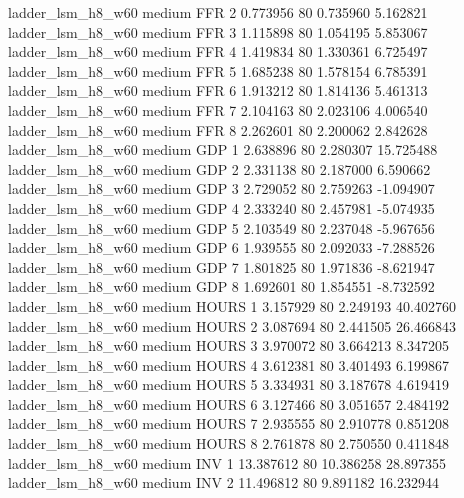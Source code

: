   ladder_lsm_h8_w60     medium      FFR                 2  0.773956 80       0.735960           5.162821
  ladder_lsm_h8_w60     medium      FFR                 3  1.115898 80       1.054195           5.853067
  ladder_lsm_h8_w60     medium      FFR                 4  1.419834 80       1.330361           6.725497
  ladder_lsm_h8_w60     medium      FFR                 5  1.685238 80       1.578154           6.785391
  ladder_lsm_h8_w60     medium      FFR                 6  1.913212 80       1.814136           5.461313
  ladder_lsm_h8_w60     medium      FFR                 7  2.104163 80       2.023106           4.006540
  ladder_lsm_h8_w60     medium      FFR                 8  2.262601 80       2.200062           2.842628
  ladder_lsm_h8_w60     medium      GDP                 1  2.638896 80       2.280307          15.725488
  ladder_lsm_h8_w60     medium      GDP                 2  2.331138 80       2.187000           6.590662
  ladder_lsm_h8_w60     medium      GDP                 3  2.729052 80       2.759263          -1.094907
  ladder_lsm_h8_w60     medium      GDP                 4  2.333240 80       2.457981          -5.074935
  ladder_lsm_h8_w60     medium      GDP                 5  2.103549 80       2.237048          -5.967656
  ladder_lsm_h8_w60     medium      GDP                 6  1.939555 80       2.092033          -7.288526
  ladder_lsm_h8_w60     medium      GDP                 7  1.801825 80       1.971836          -8.621947
  ladder_lsm_h8_w60     medium      GDP                 8  1.692601 80       1.854551          -8.732592
  ladder_lsm_h8_w60     medium    HOURS                 1  3.157929 80       2.249193          40.402760
  ladder_lsm_h8_w60     medium    HOURS                 2  3.087694 80       2.441505          26.466843
  ladder_lsm_h8_w60     medium    HOURS                 3  3.970072 80       3.664213           8.347205
  ladder_lsm_h8_w60     medium    HOURS                 4  3.612381 80       3.401493           6.199867
  ladder_lsm_h8_w60     medium    HOURS                 5  3.334931 80       3.187678           4.619419
  ladder_lsm_h8_w60     medium    HOURS                 6  3.127466 80       3.051657           2.484192
  ladder_lsm_h8_w60     medium    HOURS                 7  2.935555 80       2.910778           0.851208
  ladder_lsm_h8_w60     medium    HOURS                 8  2.761878 80       2.750550           0.411848
  ladder_lsm_h8_w60     medium      INV                 1 13.387612 80      10.386258          28.897355
  ladder_lsm_h8_w60     medium      INV                 2 11.496812 80       9.891182          16.232944
